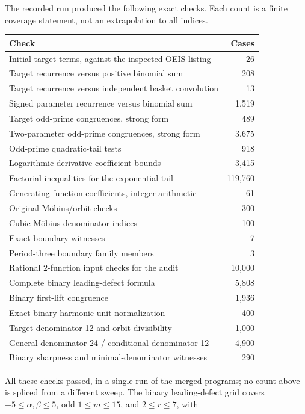 \documentclass[11pt,a4paper]{article}
\numberwithin{equation}{section}
\theoremstyle{definition}
\theoremstyle{remark}
\begin{document}
The recorded run produced the following exact checks. Each count is a finite
coverage statement, not an extrapolation to all indices.
\begin{center}
\small
\begin{tabular}{p{}r}
\toprule
Check & Cases\\
\midrule
Initial target terms, against the inspected OEIS listing &26\\
Target recurrence versus positive binomial sum &208\\
Target recurrence versus independent basket convolution &13\\
Signed parameter recurrence versus binomial sum &1,519\\
Target odd-prime congruences, strong form &489\\
Two-parameter odd-prime congruences, strong form &3,675\\
Odd-prime quadratic-tail tests &918\\
Logarithmic-derivative coefficient bounds &3,415\\
Factorial inequalities for the exponential tail &119,760\\
Generating-function coefficients, integer arithmetic &61\\
Original M\"obius/orbit checks &300\\
Cubic M\"obius denominator indices &100\\
Exact boundary witnesses &7\\
Period-three boundary family members &3\\
Rational $2$-function input checks for the audit &10,000\\
\midrule
Complete binary leading-defect formula &5,808\\
Binary first-lift congruence &1,936\\
Exact binary harmonic-unit normalization &400\\
Target denominator-12 and orbit divisibility &1,000\\
General denominator-24 / conditional denominator-12 &4,900\\
Binary sharpness and minimal-denominator witnesses &290\\
\bottomrule
\end{tabular}
\end{center}
All these checks passed, in a single run of the merged programs; no count
above is spliced from a different sweep. The binary leading-defect grid
covers $-5\le\alpha,\beta\le5$, odd $1\le m\le15$, and $2\le r\le7$, with
\end{document}
